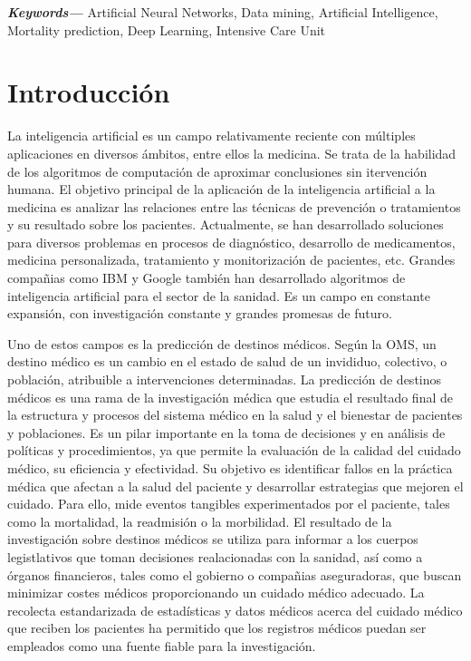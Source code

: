 \documentclass{report}
\providecommand{\keywords}[2]
{
  \small    
  \textbf{\textit{#2---}} #1 
}
\begin{document}
\vspace{5mm} 

\keywords{Artificial Neural Networks, Data mining, Artificial Intelligence, Mortality prediction, Deep Learning, Intensive Care Unit}{Keywords}



\chapter{Introducción}

La inteligencia artificial es un campo relativamente reciente con múltiples aplicaciones en diversos ámbitos, entre ellos la medicina. Se trata de la habilidad de los algoritmos de computación de aproximar conclusiones sin itervención humana. El objetivo principal de la aplicación de la inteligencia artificial a la medicina es analizar las relaciones entre las técnicas de prevención o tratamientos y su resultado sobre los pacientes. Actualmente, se han desarrollado soluciones para diversos problemas en procesos de diagnóstico, desarrollo de medicamentos, medicina personalizada, tratamiento y  monitorización de pacientes, etc. Grandes compañias como IBM y Google también han desarrollado algoritmos de inteligencia artificial para el sector de la sanidad. Es un campo en constante expansión, con investigación constante y grandes promesas de futuro. 

Uno de estos campos es la predicción de destinos médicos. Según la OMS, un destino médico es un cambio en el estado de salud de un invididuo, colectivo, o población, atribuible a intervenciones determinadas. La predicción de destinos médicos es una rama de la investigación médica que estudia el resultado final de la estructura y procesos del sistema médico en la salud y el bienestar de pacientes y poblaciones. Es un pilar importante en la toma de decisiones y en análisis de políticas y procedimientos, ya que permite la evaluación de la calidad del cuidado médico, su eficiencia y efectividad. Su objetivo es identificar fallos en la práctica médica que afectan a la salud del paciente y desarrollar estrategias que mejoren el cuidado. Para ello, mide eventos tangibles experimentados por el paciente, tales como la mortalidad, la readmisión o la morbilidad. El resultado de la investigación sobre destinos médicos se utiliza para informar a los cuerpos legistlativos que toman decisiones realacionadas con la sanidad, así como a órganos financieros, tales como el gobierno o compañias aseguradoras, que buscan minimizar costes médicos proporcionando un cuidado médico adecuado. La recolecta estandarizada de estadísticas y datos médicos acerca del cuidado médico que reciben los pacientes ha permitido que los registros médicos puedan ser empleados como una fuente fiable para la investigación.
\end{document}
